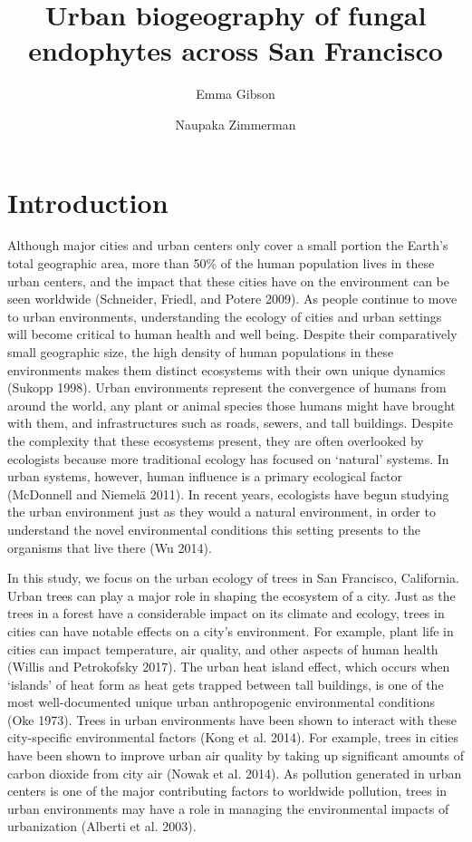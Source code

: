 \documentclass[fleqn,10pt,lineno]{wlpeerj} %
\title{Urban biogeography of fungal endophytes across San Francisco}
\author[1]{Emma Gibson}
\author[1]{Naupaka Zimmerman}
\affil[1]{Department of Biology, University of San Francisco}
\begin{document}
\flushbottom
\maketitle
\thispagestyle{empty}

\hypertarget{introduction}{%
\section*{Introduction}\label{introduction}}

Although major cities and urban centers only cover a small portion the Earth's total geographic area, more than 50\% of the human population lives in these urban centers, and the impact that these cities have on the environment can be seen worldwide (Schneider, Friedl, and Potere 2009). As people continue to move to urban environments, understanding the ecology of cities and urban settings will become critical to human health and well being. Despite their comparatively small geographic size, the high density of human populations in these environments makes them distinct ecosystems with their own unique dynamics (Sukopp 1998). Urban environments represent the convergence of humans from around the world, any plant or animal species those humans might have brought with them, and infrastructures such as roads, sewers, and tall buildings. Despite the complexity that these ecosystems present, they are often overlooked by ecologists because more traditional ecology has focused on `natural' systems. In urban systems, however, human influence is a primary ecological factor (McDonnell and Niemelä 2011). In recent years, ecologists have begun studying the urban environment just as they would a natural environment, in order to understand the novel environmental conditions this setting presents to the organisms that live there (Wu 2014).

In this study, we focus on the urban ecology of trees in San Francisco, California. Urban trees can play a major role in shaping the ecosystem of a city. Just as the trees in a forest have a considerable impact on its climate and ecology, trees in cities can have notable effects on a city's environment. For example, plant life in cities can impact temperature, air quality, and other aspects of human health (Willis and Petrokofsky 2017). The urban heat island effect, which occurs when `islands' of heat form as heat gets trapped between tall buildings, is one of the most well-documented unique urban anthropogenic environmental conditions (Oke 1973). Trees in urban environments have been shown to interact with these city-specific environmental factors (Kong et al. 2014). For example, trees in cities have been shown to improve urban air quality by taking up significant amounts of carbon dioxide from city air (Nowak et al. 2014). As pollution generated in urban centers is one of the major contributing factors to worldwide pollution, trees in urban environments may have a role in managing the environmental impacts of urbanization (Alberti et al. 2003).
\end{document}
